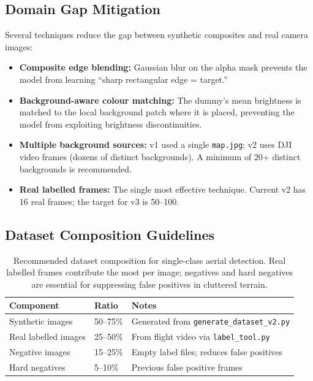\subsection{Domain Gap Mitigation}

Several techniques reduce the gap between synthetic composites and real camera images:

\begin{itemize}
    \item \textbf{Composite edge blending:} Gaussian blur on the alpha mask prevents
          the model from learning ``sharp rectangular edge = target.''
    \item \textbf{Background-aware colour matching:} The dummy's mean brightness is
          matched to the local background patch where it is placed, preventing the
          model from exploiting brightness discontinuities.
    \item \textbf{Multiple background sources:} v1 used a single \texttt{map.jpg};
          v2 uses DJI video frames (dozens of distinct backgrounds). A minimum of
          20+ distinct backgrounds is recommended.
    \item \textbf{Real labelled frames:} The single most effective technique.
          Current v2 has 16 real frames; the target for v3 is 50--100.
\end{itemize}

\subsection{Dataset Composition Guidelines}

\begin{table}[htbp]
\centering
\caption{Recommended dataset composition for single-class aerial detection.  Real labelled frames contribute the most per image; negatives and hard negatives are essential for suppressing false positives in cluttered terrain.}
\label{tab:dataset-composition}
\begin{tabular}{lll}
\hline
\textbf{Component} & \textbf{Ratio} & \textbf{Notes} \\
\hline
Synthetic images   & 50--75\% & Generated from \texttt{generate\_dataset\_v2.py} \\
Real labelled images & 25--50\% & From flight video via \texttt{label\_tool.py} \\
Negative images    & 15--25\% & Empty label files; reduces false positives \\
Hard negatives     & 5--10\% & Previous false positive frames \\
\hline
\end{tabular}
\end{table}


